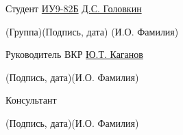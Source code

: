 \documentclass[14pt, russian]{scrartcl}
\begin{document}
\begin{titlepage}
\newlength{\ML}

\noindent Студент \underline{ИУ9-82Б} \hfill \underline{\hspace{4cm}}\quad
\underline{\hspace{1.1cm}Д.С. Головкин\hspace{1cm}}


\vspace{-2.1ex}
\noindent\hspace{9ex}\scriptsize{(Группа)}\normalsize\hspace{170pt}\hspace{2ex}\scriptsize{(Подпись, дата)}
\normalsize\hspace{30pt}\hspace{6ex}\scriptsize{(И.О. Фамилия)}\normalsize

\bigskip
\noindent Руководитель ВКР  \hfill \underline{\hspace{4cm}}\quad
\underline{\hspace{0.6cm}Ю.Т. Каганов\hspace{0.6cm}}

\vspace{-2ex}
\noindent\hspace{13.5ex}\normalsize\hspace{170pt}\hspace{2ex}\scriptsize{(Подпись, дата)}\normalsize\hspace{30pt}\hspace{6ex}\scriptsize{(И.О. Фамилия)}\normalsize
\bigskip

\noindent Консультант \hfill \underline{\hspace{4cm}}\quad
\underline{\hspace{4cm}}

\vspace{-2ex}
\noindent\hspace{13.5ex}\normalsize\hspace{170pt}\hspace{2ex}\scriptsize{(Подпись, дата)}\normalsize\hspace{30pt}\hspace{6ex}\scriptsize{(И.О. Фамилия)}\normalsize
\bigskip


\end{titlepage}
\end{document}
